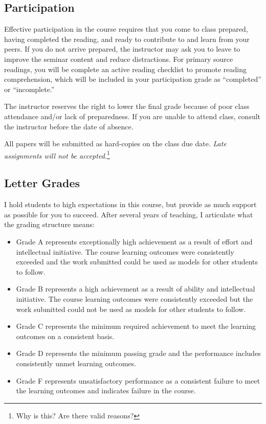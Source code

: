 \subsection{Participation}

Effective participation in the course requires that you come to class prepared, having completed the reading, and ready to contribute to and learn from your peers. If you do not arrive prepared, the instructor may ask you to leave to improve the seminar content and reduce distractions. For primary source readings, you will be complete an active reading checklist to promote reading comprehension, which will be included in your participation grade as ``completed'' or ``incomplete.''

The instructor reserves the right to lower the final grade because of poor class attendance and/or lack of preparedness. If you are unable to attend class, consult the instructor before the date of absence.

All papers will be submitted as hard-copies on the class due date. \emph{Late assignments will not be accepted.}\footnote{Why is this? Are there valid reasons?} 

\subsection{Letter Grades}

I hold students to high expectations in this course, but provide as much support as possible for you to succeed. After several years of teaching, I articulate what the grading structure means:
  
\begin{itemize}
	\item Grade A represents exceptionally high achievement as a result of effort and intellectual initiative. The course learning outcomes were consistently exceeded and the work submitted could be used as models for other students to follow.
	\item Grade B represents a high achievement as a result of ability and intellectual initiative. The course learning outcomes were consistently exceeded but the work submitted could not be used as models for other students to follow.
	\item Grade C represents the minimum required achievement to meet the learning outcomes on a consistent basis. 
	\item Grade D represents the minimum passing grade and the performance includes consistently unmet learning outcomes. 
	\item Grade F represents unsatisfactory performance as a consistent failure to meet the learning outcomes and indicates failure in the course.
\end{itemize}

